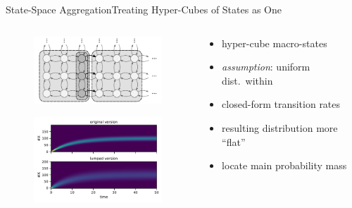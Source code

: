 \documentclass[10pt]{beamer}
\newcommand{\bottomcite}[1]{\vspace*{\fill} {\scriptsize \parencite{#1}}}
\begin{document}
\begin{frame}{State-Space Aggregation}{Treating Hyper-Cubes of States as One}
    \begin{columns}
        \begin{column}{.4\textwidth}
            \begin{figure}
            \includegraphics[width=5cm]{../gfx/macro_states.pdf}
            \end{figure}
            \begin{figure}
                \includegraphics[width=50mm]{../gfx/lumpedvorig.pdf}
            \end{figure}
        \end{column}
        \begin{column}{.6\textwidth}
            \begin{itemize}
                \item hyper-cube macro-states
                \item \emph{assumption}: uniform dist.\ within
                \item closed-form transition rates
            \end{itemize}
            \vspace{17mm}
            \begin{itemize}
                \item resulting distribution more ``flat''
                \item locate main probability mass
            \end{itemize}
            \vspace{4mm}
        \end{column}
    \end{columns}
    \bottomcite{backenkohler2021abstraction}
\end{frame}
\end{document}
